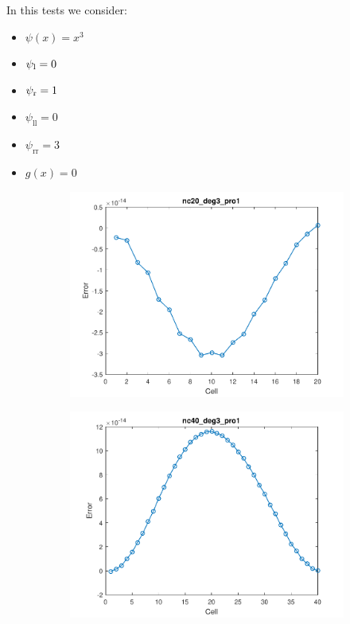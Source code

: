 \documentclass[11pt,a4paper]{article}
\author{}
\title{}
\theoremstyle{plain}
\theoremstyle{definition}
\begin{document}
In this tests we consider:
\begin{itemize}
\item $\psi(x)=x^3$
\item $\psi_\text l=0$
\item $\psi_\text r=1$
\item $\psi_\text{ll}=0$
\item $\psi_\text{rr}=3$
\item $g(x)=0$
\end{itemize}



\begin{figure}[H]
\begin{subfigure}[b]{0.48\textwidth}
\includegraphics[width=\linewidth]{../../tests_01_01/test_01_01_test47_pro1/output/plots/nc20_deg3_wei111_pro1.pdf}
\end{subfigure}\hspace*{\fill}
\begin{subfigure}[b]{0.48\textwidth}
\includegraphics[width=\linewidth]{../../tests_01_01/test_01_01_test47_pro1/output/plots/nc40_deg3_wei111_pro1.pdf}
\end{subfigure}


\end{figure}
\end{document}
